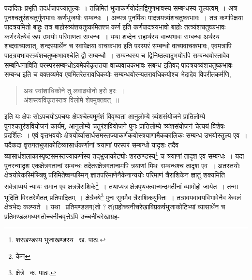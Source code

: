 \documentclass[11pt, openany]{book}
\begin{document}
\newpage

\noindent पदादितः प्रभृति तदर्धचापज्यातुल्यः~। तन्निमितं भुजाकर्णयोर्दलद्विगुणभावस्य सम्बन्धस्य तुल्यत्वम्~। अत्र पुनश्चतुरंशचतुर्गुणभावः कर्णभुजयोः सम्बन्धः~। अन्यत्र पुनर्मिथः पादत्रयत्र्यंशचतुष्कभावः~। तत्र कर्णापेक्षया पादत्रयमितो बाहुः तत्र बाहोस्त्र्यंशचतुष्कमितश्च कर्ण इति कर्णपादत्रयभावो बाहोः तत्त्र्यंशचतुष्कभावः कर्णस्येत्येवं रूप उभयोः परिमाणतः सम्बन्धः~। यथा शब्देन सहार्थस्य वाच्यभावः सम्बन्धः अर्थस्य शब्दवाच्यत्वात्, शन्दस्यार्थेन च स्वापेक्षया वाचकभाव इति परस्परं सम्बन्धो वाच्यवाचकभावः, एवमत्रापि पादत्रयभावस्त्र्यंशचतुष्कभावश्चेति द्वौ सम्बन्धौ~। सम्बन्धस्य च द्विनिष्ठत्वादुभयोरपि सम्बन्धयोस्तावेव सम्बन्धिनाविति परस्परसम्बन्धोऽयमेकीकृततया वाच्यवाचकभावः सबन्ध इतिवद् पादत्रयत्र्यंशचतुष्कभावः सम्बन्ध इति च वक्तव्यमेव एवमितरेतरावधिकयोः सम्बन्धयोरन्यतरावधिकयोश्च भेदादेव विपरीतकर्मणि,

\begin{quote}
{\qt अथ स्वांशाधिकोने तु लवाढ्योनो हरो हरः~।\\
अंशस्त्वविकृतस्तत्र विलोमे शेषमुक्तवत्~॥}
\end{quote}

\noindent इति {\qt यः क्षेपः सोऽपचयोऽपचयः क्षेपश्चे}त्यमुमंशं विवृण्वता आनुलोम्ये त्र्यंशसंयोजने प्रातिलोम्ये पुनश्चतुरंशवियोजनं कार्यम्,
आनुलोम्ये चतुरंशवियोजने पुनः प्रातिलोम्ये त्र्यंशसंयोजनं चेत्ययं विशेषः प्रदर्शितः~। एवं वृत्तभवयोः क्षेत्रयोर्व्यासार्धसमस्तज्याकर्णकयोस्त्रयाणामैककालिकः सम्बन्ध उभयोस्तुल्य एव~। यदैकदा वृत्तगतभुजाकोटिव्यासार्धकर्णानां त्रयाणां परस्परं सम्बन्धो यादृशः तदैव व्यासार्धशलाकास्पृष्टसमस्तज्याकर्णस्य तद्भुजाकोट्योः शरखण्डस्य\renewcommand{\thefootnote}{१}\footnote{शरखण्डस्य भुजाखण्डस्य \textendash\ ख. पाठः.} च त्रयाणां तादृश एव सम्बन्धः~। यदा पुनरन्यादृश एकक्षेत्रगतानां सम्बन्धः तदेतरक्षेत्रगतानामपि त्रयाणां मिथः सम्बन्धश्च तादृश एव~। अतस्तयोः क्षेत्रयोरेकस्मिंस्त्रिषु परिमितेष्वन्यस्मिन् ज्ञातपरिमाणेनैकेनान्ययोः परिमाणं त्रैराशिकेन ज्ञातुं शक्यमिति सर्वत्राप्ययं न्यायः समान एव क्षत्रत्रैराशिके\renewcommand{\thefootnote}{२}\footnote{केन}~। तथाप्यत्र
क्षेत्रपृथक्त्वान्मन्दमतीनां व्यामोहो जायेत~। तन्मा भूदिति विस्तरेणैतत् प्रतिपादितम्~। क्षेत्रैक्ये\renewcommand{\thefootnote}{३}\footnote{क्षेत्रे \textendash\ क. पाठः.} पुनः सुगमैव त्रैराशिकयुक्तिः~। तत्रावयवावयविभावेनैव केवलं क्षेत्रभेदः कल्प्यते~। यथा \textendash\ प्रतिमण्डलग(तो ? त)ग्रहोच्चनीचरेखाविप्रकर्षभुजाकोटिभ्यां व्यासार्धेन च प्रतिमण्डलमध्यगतोच्चनीचवृत्तेऽपि उच्चनीचरेखाग्रह-

\newpage
\end{document}
